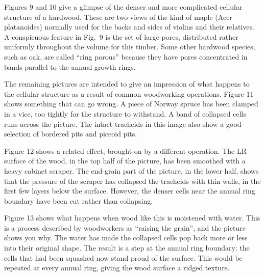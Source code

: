 

  Figures 9 and 10 give a glimpse of the denser and more complicated cellular 
  structure of a hardwood. These are two views of the kind of maple (Acer 
  platanoides) normally used for the backs and sides of violins and their 
  relatives. A conspicuous feature in Fig.\ 9 is the set of large pores, 
  distributed rather uniformly throughout the volume for this timber. Some 
  other hardwood species, such as oak, are called “ring porous” because they 
  have pores concentrated in bands parallel to the annual growth rings. 



  The remaining pictures are intended to give an impression of what happens to 
  the cellular structure as a result of common woodworking operations. Figure 
  11 shows something that can go wrong. A piece of Norway spruce has been 
  clamped in a vice, too tightly for the structure to withstand. A band of 
  collapsed cells runs across the picture. The intact tracheids in this image 
  also show a good selection of bordered pits and piceoid pits. 


  Figure 12 shows a related effect, brought on by a different operation. The LR 
  surface of the wood, in the top half of the picture, has been smoothed with a 
  heavy cabinet scraper. The end-grain part of the picture, in the lower half, 
  shows that the pressure of the scraper has collapsed the tracheids with thin 
  walls, in the first few layers below the surface. However, the denser cells 
  near the annual ring boundary have been cut rather than collapsing. 

  Figure 13 shows what happens when wood like this is moistened with water. 
  This is a process described by woodworkers as “raising the grain”, and the 
  picture shows you why. The water has made the collapsed cells pop back more 
  or less into their original shape. The result is a step at the annual ring 
  boundary: the cells that had been squashed now stand proud of the surface. 
  This would be repeated at every annual ring, giving the wood surface a ridged 
  texture. 

